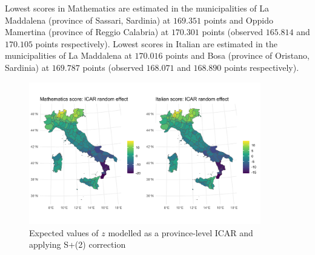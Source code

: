\documentclass{book}
\begin{document}
Lowest scores in Mathematics are estimated in the municipalities of La Maddalena (province of Sassari, Sardinia) at $169.351$ points and Oppido Mamertina (province of Reggio Calabria) at $170.301$ points  (observed $165.814$ and $170.105$ points respectively). Lowest scores in Italian are estimated in the municipalities of La Maddalena at $170.016$ points  and Bosa (province of Oristano, Sardinia) at $169.787$ points (observed $168.071$ and $168.890$ points respectively).



\begin{figure}
  \centering
  \includegraphics[width=0.9\textwidth]{z_IMCAR_spatplus_waic.pdf} 
  \caption{Expected values of $z$ modelled as a province-level ICAR and applying S+(2) correction}
  \label{fig:zprov}
\end{figure}
\end{document}
